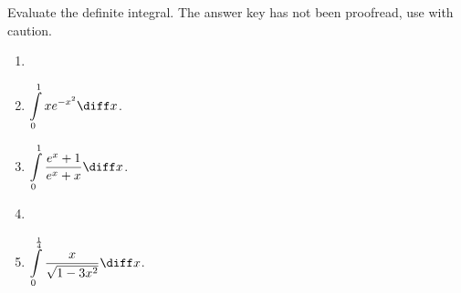 Evaluate the definite integral. The answer key has not been proofread, use with caution.
\begin{enumerate}[ref={\fcProblemRef}]
\item 
\item $\displaystyle\int\limits_{0}^{1}xe^{-x^2} \diff x$.

\item $\displaystyle\int\limits_{0}^{1}\frac{e^x+1}{e^x+x} \diff x$.

\item 
\item $\displaystyle\int\limits_{0}^{\frac{1}4}\frac{x }{\sqrt{1-3x^2}}\diff x$.


\end{enumerate}
